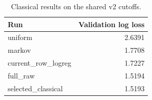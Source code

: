 \begin{table}[htbp]
\centering\small
\begin{tabular}{@{}lr@{}}
\toprule
Run & Validation log loss \\
\midrule
uniform & 2.6391 \\
markov & 1.7708 \\
current\_row\_logreg & 1.7227 \\
full\_raw & 1.5194 \\
selected\_classical & 1.5193 \\
\bottomrule
\end{tabular}
\caption{Classical results on the shared v2 cutoffs.}
\end{table}
